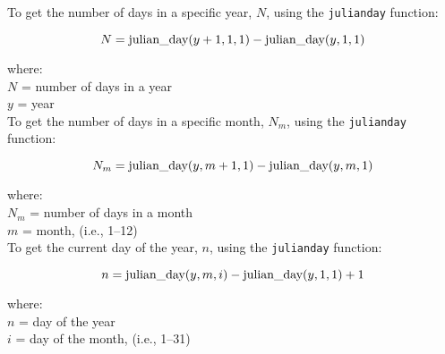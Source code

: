 To get the number of days in a specific year, $N$, using the \texttt{julian\textunderscore day} function:

\begin{equation}
\label{eq:ny}
    N = \text{julian\textunderscore day}(y+1, 1, 1) 
        - \text{julian\textunderscore day}(y, 1, 1)
\end{equation}

\noindent where: \\
\indent $N$ = number of days in a year \\
\indent $y$ = year \\

To get the number of days in a specific month, $N_{m}$, using the \texttt{julian\textunderscore day} function:

\begin{equation}
\label{eq:dmo}
    N_{m} = \text{julian\textunderscore day}(y, m+1, 1) 
            - \text{julian\textunderscore day}(y, m, 1)
\end{equation}

\noindent where: \\
\indent $N_m$ = number of days in a month \\
\indent $m$ = month, (i.e., 1--12) \\

To get the current day of the year, $n$, using the \texttt{julian\textunderscore day} function:

\begin{equation}
\label{eq:doy}
    n = \text{julian\textunderscore day}(y, m, i) 
        - \text{julian\textunderscore day}(y, 1, 1) 
        + 1
\end{equation}

\noindent where: \\
\indent $n$ = day of the year \\
\indent $i$ = day of the month, (i.e., 1--31) \\

